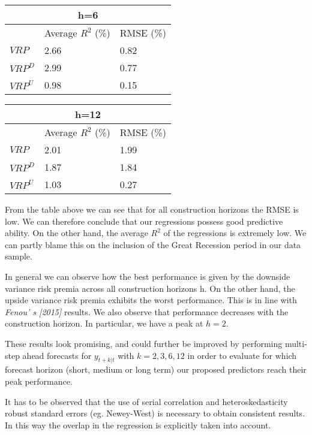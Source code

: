 \vspace{2mm}
\begin{tabular}{ p{2cm}||p{4cm}|p{4cm} }
  \hline
  \multicolumn{3}{c}{\textbf{h=6}} \\
 \hline
 & Average $R^2$ (\%) &  RMSE (\%)   \\
 \hline
 $VRP$&   2.66  & 0.82   \\
  $VRP^D$   & 2.99   & 0.77 \\
 $VRP^U$ & 0.98 & 0.15\\
 \hline
\end{tabular}

\vspace{2mm}
\begin{tabular}{ p{2cm}||p{4cm}|p{4cm} }
  \hline
  \multicolumn{3}{c}{\textbf{h=12}} \\
 \hline
 & Average $R^2$ (\%) &  RMSE (\%)   \\
 \hline
 $VRP$&   2.01  & 1.99   \\
 $VRP^D$   &1.87  & 1.84  \\
 $VRP^U$ &1.03 & 0.27  \\
 \hline
\end{tabular}
 
 \vspace{4mm} 
From the table above we can see that for all construction horizons the RMSE is low. We can therefore conclude that our regressions possess good predictive ability. On the other hand, the average $R^2$ of the regressions is extremely low. We can partly blame this on the inclusion of the Great Recession period in our data sample. 

 \vspace{4mm} 
In general we can observe how the best performance is given by the downside variance risk premia across all construction horizons h. On the other hand, the upside variance risk premia exhibits the worst performance. This is in line with \textit{Fenou' s [2015]} results. We also observe that performance decreases with the construction horizon. In particular, we have a peak  at $h=2$. 
  

 \vspace{4mm} 
 These results look promising, and could further be improved by performing multi-step ahead forecasts for $y_{t+k|t}$ with $k=2,3,6,12$ in order to evaluate for which forecast horizon (short, medium or long term) our proposed predictors reach their peak performance.

 \vspace{4mm} 
It has to be observed that the use of serial correlation and heteroskedasticity robust standard errors (eg. Newey-West) is necessary to obtain consistent results. In this way the overlap in the regression is explicitly taken into account.










